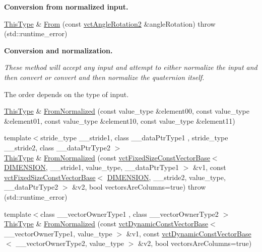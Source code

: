\begin{Indent}{\bf Conversion from normalized input.}
\begin{DoxyCompactItemize}
\item 
\hyperlink{classvct_matrix_rotation2_base_a47ffeef2ddecede4b16bcc88fb432ff5}{This\-Type} \& \hyperlink{classvct_matrix_rotation2_base_afbc1961d916a4e8b6bf6b083a1940304}{From} (const \hyperlink{classvct_angle_rotation2}{vct\-Angle\-Rotation2} \&angle\-Rotation)  throw (std\-::runtime\-\_\-error)
\end{DoxyCompactItemize}
\end{Indent}
\begin{Indent}{\bf Conversion and normalization.}\par
{\em These method will accept any input and attempt to either normalize the input and then convert or convert and then normalize the quaternion itself.\par
The order depends on the type of input. }\begin{DoxyCompactItemize}
\item 
\hyperlink{classvct_matrix_rotation2_base_a47ffeef2ddecede4b16bcc88fb432ff5}{This\-Type} \& \hyperlink{classvct_matrix_rotation2_base_a79b7b460ac156625df7fbe74e6b36b08}{From\-Normalized} (const value\-\_\-type \&element00, const value\-\_\-type \&element01, const value\-\_\-type \&element10, const value\-\_\-type \&element11)
\item 
{\footnotesize template$<$stride\-\_\-type \-\_\-\-\_\-stride1, class \-\_\-\-\_\-data\-Ptr\-Type1 , stride\-\_\-type \-\_\-\-\_\-stride2, class \-\_\-\-\_\-data\-Ptr\-Type2 $>$ }\\\hyperlink{classvct_matrix_rotation2_base_a47ffeef2ddecede4b16bcc88fb432ff5}{This\-Type} \& \hyperlink{classvct_matrix_rotation2_base_ae41352b46d2cc7d5ab56c359e7ef2511}{From\-Normalized} (const \hyperlink{classvct_fixed_size_const_vector_base}{vct\-Fixed\-Size\-Const\-Vector\-Base}$<$ \hyperlink{classvct_matrix_rotation2_base_ac10279ed12ec787b1a4833ea02771348acefb9855f54f0cfd782e785c9083e592}{D\-I\-M\-E\-N\-S\-I\-O\-N}, \-\_\-\-\_\-stride1, value\-\_\-type, \-\_\-\-\_\-data\-Ptr\-Type1 $>$ \&v1, const \hyperlink{classvct_fixed_size_const_vector_base}{vct\-Fixed\-Size\-Const\-Vector\-Base}$<$ \hyperlink{classvct_matrix_rotation2_base_ac10279ed12ec787b1a4833ea02771348acefb9855f54f0cfd782e785c9083e592}{D\-I\-M\-E\-N\-S\-I\-O\-N}, \-\_\-\-\_\-stride2, value\-\_\-type, \-\_\-\-\_\-data\-Ptr\-Type2 $>$ \&v2, bool vectors\-Are\-Columns=true)  throw (std\-::runtime\-\_\-error)
\item 
{\footnotesize template$<$class \-\_\-\-\_\-vector\-Owner\-Type1 , class \-\_\-\-\_\-vector\-Owner\-Type2 $>$ }\\\hyperlink{classvct_matrix_rotation2_base_a47ffeef2ddecede4b16bcc88fb432ff5}{This\-Type} \& \hyperlink{classvct_matrix_rotation2_base_a620f23f92a10db631bae364db60bd5aa}{From\-Normalized} (const \hyperlink{classvct_dynamic_const_vector_base}{vct\-Dynamic\-Const\-Vector\-Base}$<$ \-\_\-\-\_\-vector\-Owner\-Type1, value\-\_\-type $>$ \&v1, const \hyperlink{classvct_dynamic_const_vector_base}{vct\-Dynamic\-Const\-Vector\-Base}$<$ \-\_\-\-\_\-vector\-Owner\-Type2, value\-\_\-type $>$ \&v2, bool vectors\-Are\-Columns=true)

\end{DoxyCompactItemize}
\end{Indent}
